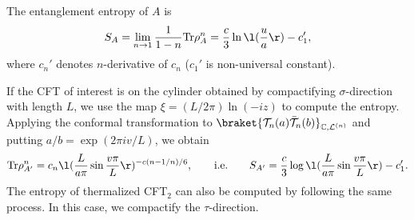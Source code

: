 \documentclass[12pt]{article}
\begin{document}
The entanglement entropy of $A$ is 
\begin{align}
	S_A = \lim_{n\to 1}\frac{1}{1-n}\mathrm{Tr}\rho_A^n = \frac{c}{3}\ln\l(\frac{u}{a}\r) - c_1',
\end{align}
where $c_n'$ denotes $n$-derivative of $c_n$ ($c_1'$ is non-universal constant).

If the CFT of interest is on the cylinder obtained by compactifying $\sigma$-direction with length $L$, we use the map $\xi = (L/2\pi)\ln (-iz)$ to compute the entropy.
Applying the conformal transformation to $\braket{\mathcal T_n(a)\bar{\mathcal T}_n(b)}_{\mathbb C,\mathcal L^{(n)}}$ and putting $a/b = \exp(2\pi i v/L)$, we obtain
\begin{align}
	\mathrm{Tr}\rho_{A'}^n = c_n\l(\frac{L}{a\pi }\sin\frac{v\pi}{L}\r)^{-c(n-1/n)/6},\qquad
	\mathrm{i.e.}\qquad
	S_{A'} = \frac{c}{3}\log\l(\frac{L}{a \pi}\sin\frac{v\pi}{L}\r) - c_1'.
\end{align}
The entropy of thermalized CFT$_2$ can also be computed by following the same process.
In this case, we compactify the $\tau$-direction.






 

\end{document}
